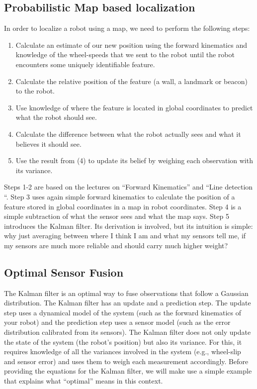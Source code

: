 \subsection{Probabilistic Map based localization}
In order to localize a robot using a map, we need to perform the following steps:
\begin{enumerate}
\item Calculate an estimate of our new position using the forward kinematics and knowledge of the wheel-speeds that we sent to the robot until the robot encounters some uniquely identifiable feature.
\item Calculate the relative position of the feature (a wall, a landmark or beacon) to the robot.
\item Use knowledge of where the feature is located in global coordinates to predict what the robot should see.
\item Calculate the difference between what the robot actually sees and what it believes it should see.
\item Use the result from (4) to update its belief by weighing each observation with its variance.
\end{enumerate}

Steps 1-2 are based on the lectures on ``Forward Kinematics'' and ``Line detection ``. Step 3 uses again simple forward kinematics to calculate the position of a feature stored in global coordinates in a map in robot coordinates. Step 4 is a simple subtraction of what the sensor sees and what the map says. Step 5 introduces the Kalman filter. Its derivation is involved, but its intuition is simple: why just averaging between where I think I am and what my sensors tell me, if my sensors are much more reliable and should carry much higher weight?

\subsection{Optimal Sensor Fusion}
The Kalman filter is an optimal way to fuse observations that follow a Gaussian distribution. The Kalman filter has an update and a prediction step. The update step uses a dynamical model of the system (such as the forward kinematics of your robot) and the prediction step uses a sensor model (such as the error distribution calibrated from its sensors). The Kalman filter does not only update the state of the system (the robot's position) but also its variance. For this, it requires knowledge of all the variances involved in the system (e.g., wheel-slip and sensor error) and uses them to weigh each measurement accordingly. Before providing the equations for the Kalman filter, we will make use a simple example that explains what ``optimal'' means in this context.

